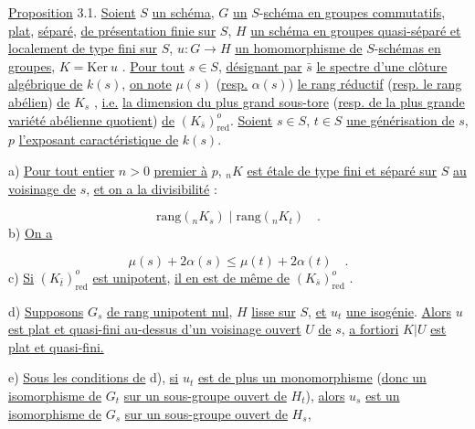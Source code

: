 \underline{Proposition} 3.1. \underline{Soient} $S$ \underline{un schéma}, $G$ \underline{un} $S$-\underline{schéma en groupes commutatifs}, \underline{plat}, \underline{séparé}, \underline{de présentation finie sur} $S$, $H$ \underline{un schéma en groupes quasi-séparé et localement de type fini sur} $S$, $u: G \longrightarrow H$ \underline{un homomorphisme de} $S$-\underline{schémas en groupes}, $K = \mathrm{Ker}\ u$ . \underline{Pour tout} $s \in S$, \underline{désignant par} $\bar{s}$ \underline{le spectre d'une clôture algébrique de} $k(s)$, \underline{on note} $\mu(s)$ (\underline{resp.} $\alpha(s)$) \underline{le rang réductif} (\underline{resp. le rang abélien}) \underline{de} $K_{s}$ , \underline{i.e.} \underline{la dimension du plus grand sous-tore} (\underline{resp. de la plus grande variété abélienne quotient}) \underline{de} $(K_{\bar{s}})^{o}_{\mathrm{red}}$. \underline{Soient} $s \in S$, $t \in S$ \underline{une générisation de} $s$, $p$ \underline{l'exposant caractéristique de} $k(s)$.

a) \underline{Pour tout entier} $n > 0$ \underline{premier à} $p$, ${}_{n}K$ \underline{est étale de type fini et séparé sur} $S$ \underline{au voisinage de} $s$, \underline{et on a la divisibilité} :

\begin{equation}\tag{3.1.1}
\mathrm{rang}({}_{n}K_{s}) \mid \mathrm{rang}({}_{n}K_{t}) \quad .
\end{equation}
b) \underline{On a}

\begin{equation}\tag{3.1.2}
\mu(s) + 2\alpha(s) \leq \mu(t) + 2\alpha(t) \quad .
\end{equation}
c) \underline{Si} $(K_{\bar{t}})^{o}_{\mathrm{red}}$ \underline{est unipotent}, \underline{il en est de même de} $(K_{\bar{s}})^{o}_{\mathrm{red}}$ .

d) \underline{Supposons} $G_{s}$ \underline{de rang unipotent nul}, $H$ \underline{lisse sur} $S$, \underline{et} $u_{t}$ \underline{une isogénie}. \underline{Alors} $u$ \underline{est plat et quasi-fini au-dessus d'un voisinage ouvert} $U$ \underline{de} $s$, \underline{a fortiori} $K|U$ \underline{est plat et quasi-fini.}

e) \underline{Sous les conditions de} d), \underline{si} $u_{t}$ \underline{est de plus un monomorphisme} (\underline{donc un isomorphisme de} $G_{t}$ \underline{sur un sous-groupe ouvert de} $H_{t}$), \underline{alors} $u_{s}$ \underline{est un isomorphisme de} $G_{s}$ \underline{sur un sous-groupe ouvert de} $H_{s}$,


